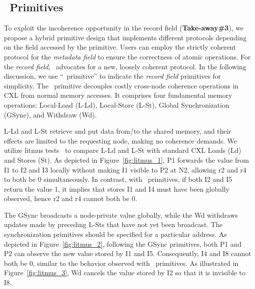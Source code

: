 \subsection{\name~Primitives}


To exploit the incoherence opportunity in the record field (\textbf{Take-away\#3}), we propose a hybrid primitive design that implements different protocols depending on the field accessed by the primitive. Users can employ the strictly coherent protocol for the \textit{metadata field} to ensure the correctness of atomic operations. For the \textit{record field}, \name~advocates for a new, loosely coherent protocol. In the following discussion, we use ``\name~primitive'' to indicate the \textit{record field} primitives for simplicity. The \name~primitive decouples costly cross-node coherence operations in CXL from normal memory accesses. It comprises four fundamental memory operations: Local-Load (L-Ld), Local-Store (L-St), Global Synchronization (GSync), and Withdraw (Wd).


L-Ld and L-St retrieve and put data from/to the shared memory, and their effects are limited to the requesting node, making no coherence demands. 
We utilize litmus tests~\cite{rvweak_pact17} to compare L-Ld and L-St with standard CXL Loads (Ld) and Stores (St). 
As depicted in Figure~\ref{fig:litmus_1}, P1 forwards the value from I1 to I2 and I3 locally without making I1 visible to P2 at N2, allowing r2 and r4 to both be 0 simultaneously. In contrast, with \vanilla~primitives, if both I2 and I5 return the value 1, it implies that stores I1 and I4 must have been globally observed, hence r2 and r4 cannot both be 0.


The GSync broadcasts a node-private value globally, while the Wd withdraws updates made by preceding L-Sts that have not yet been broadcast. 
The synchronization primitives should be specified for a particular address.
As depicted in Figure~\ref{fig:litmus_2}, following the GSync primitives, both P1 and P2 can observe the new value stored by I1 and I5. Consequently, I4 and I8 cannot both be 0, similar to the behavior observed with \vanilla~primitives.
As illustrated in Figure~\ref{fig:litmus_3}, Wd cancels the value stored by I2 so that it is invisible to I8.



